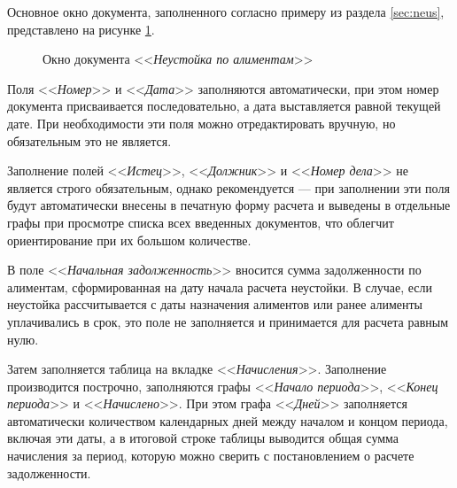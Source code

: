 \documentclass[a4paper,12pt,draft]{article}
\begin{document}
Основное окно документа, заполненного согласно примеру из раздела \ref{sec:neus}, представлено на рисунке \ref{ris:neus}.
\begin{figure}[h]
\caption{Окно документа <<{\it Неустойка по алиментам}>>}
\label{ris:neus}
\end{figure}

Поля <<{\it Номер}>> и <<{\it Дата}>> заполняются автоматически, при этом номер документа присваивается последовательно, а дата выставляется равной текущей дате. При необходимости эти поля можно отредактировать вручную, но обязательным это не является.

Заполнение полей <<{\it Истец}>>, <<{\it Должник}>> и <<{\it Номер дела}>> не является строго обязательным, однако рекомендуется --- при заполнении эти поля будут автоматически внесены в печатную форму расчета и выведены в отдельные графы при просмотре списка всех введенных документов, что облегчит ориентирование при их большом количестве.

В поле <<{\it Начальная задолженность}>> вносится сумма задолженности по алиментам, сформированная на дату начала расчета неустойки. В случае, если неустойка рассчитывается с даты назначения алиментов или ранее алименты уплачивались в срок, это поле не заполняется и принимается для расчета равным нулю.

Затем заполняется таблица на вкладке <<{\it Начисления}>>. Заполнение производится построчно, заполняются графы <<{\it Начало периода}>>, <<{\it Конец периода}>> и <<{\it Начислено}>>. При этом графа <<{\it Дней}>> заполняется автоматически количеством календарных дней между началом и концом периода, включая эти даты, а в итоговой строке таблицы выводится общая сумма начисления за период, которую можно сверить с постановлением о расчете задолженности.
\end{document}
